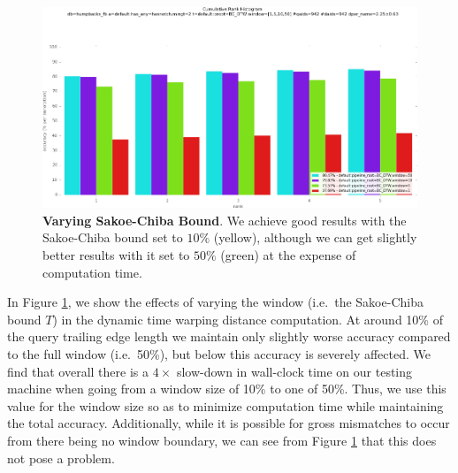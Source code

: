 
\begin{figure}[t]%
\centering
\includegraphics[width=1\textwidth]{../images/results/vary_window.png}
\caption{\textbf{Varying Sakoe-Chiba Bound}. We achieve good results with the Sakoe-Chiba bound set to $10\%$ (yellow), although we can get slightly better results with it set to $50\%$ (green) at the expense of computation time.}
\label{fig:vary_window}
\end{figure}



In Figure \ref{fig:vary_window}, we show the effects of varying the window (i.e.\ the Sakoe-Chiba bound $T$) in the dynamic time warping distance computation.
At around 10\% of the query trailing edge length we maintain only slightly worse accuracy compared to the full window (i.e.\ 50\%), but below this accuracy is severely affected.
We find that overall there is a $4\times$ slow-down in wall-clock time on our testing machine when going from a window size of 10\% to one of 50\%. 
Thus, we use this value for the window size so as to minimize computation time while maintaining the total accuracy.
Additionally, while it is possible for gross mismatches to occur from there being no window boundary, we can see from Figure \ref{fig:vary_window} that this does not pose a problem.


